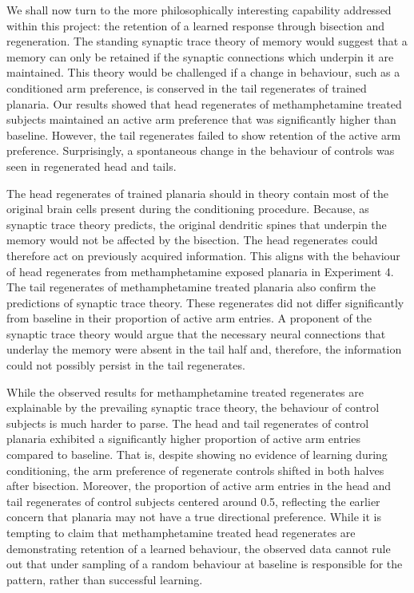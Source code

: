 \documentclass[
  jou,
  floatsintext,
  longtable,
  nolmodern,
  notxfonts,
  notimes,
  donotrepeattitle,
  colorlinks=true,linkcolor=blue,citecolor=blue,urlcolor=blue]{apa7}
\begin{document}
We shall now turn to the more philosophically interesting capability
addressed within this project: the retention of a learned response
through bisection and regeneration. The standing synaptic trace theory
of memory would suggest that a memory can only be retained if the
synaptic connections which underpin it are maintained. This theory would
be challenged if a change in behaviour, such as a conditioned arm
preference, is conserved in the tail regenerates of trained planaria.
Our results showed that head regenerates of methamphetamine treated
subjects maintained an active arm preference that was significantly
higher than baseline. However, the tail regenerates failed to show
retention of the active arm preference. Surprisingly, a spontaneous
change in the behaviour of controls was seen in regenerated head and
tails.

The head regenerates of trained planaria should in theory contain most
of the original brain cells present during the conditioning procedure.
Because, as synaptic trace theory predicts, the original dendritic
spines that underpin the memory would not be affected by the bisection.
The head regenerates could therefore act on previously acquired
information. This aligns with the behaviour of head regenerates from
methamphetamine exposed planaria in Experiment 4. The tail regenerates
of methamphetamine treated planaria also confirm the predictions of
synaptic trace theory. These regenerates did not differ significantly
from baseline in their proportion of active arm entries. A proponent of
the synaptic trace theory would argue that the necessary neural
connections that underlay the memory were absent in the tail half and,
therefore, the information could not possibly persist in the tail
regenerates.

While the observed results for methamphetamine treated regenerates are
explainable by the prevailing synaptic trace theory, the behaviour of
control subjects is much harder to parse. The head and tail regenerates
of control planaria exhibited a significantly higher proportion of
active arm entries compared to baseline. That is, despite showing no
evidence of learning during conditioning, the arm preference of
regenerate controls shifted in both halves after bisection. Moreover,
the proportion of active arm entries in the head and tail regenerates of
control subjects centered around 0.5, reflecting the earlier concern
that planaria may not have a true directional preference. While it is
tempting to claim that methamphetamine treated head regenerates are
demonstrating retention of a learned behaviour, the observed data cannot
rule out that under sampling of a random behaviour at baseline is
responsible for the pattern, rather than successful learning.
\end{document}
